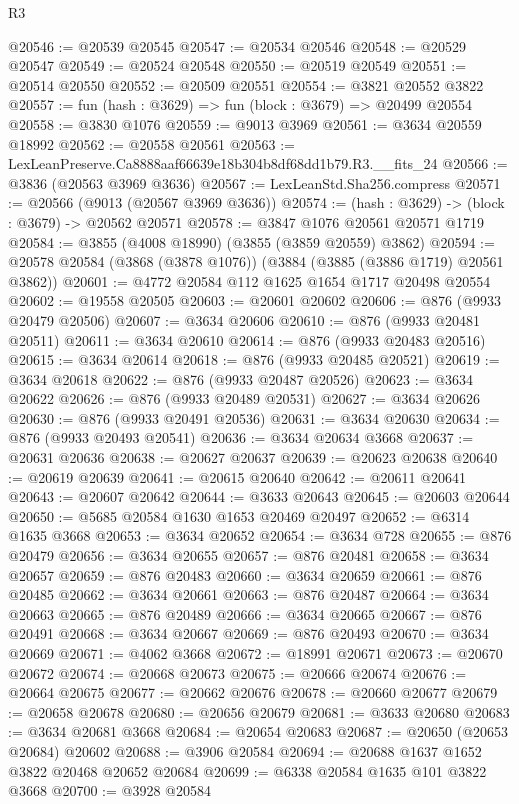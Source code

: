 \begin{lexlean}{R3}
\begin{coremodule}
@20546 := @20539 @20545
@20547 := @20534 @20546
@20548 := @20529 @20547
@20549 := @20524 @20548
@20550 := @20519 @20549
@20551 := @20514 @20550
@20552 := @20509 @20551
@20554 := @3821 @20552 @3822
@20557 := fun (hash : @3629) => fun (block : @3679) => @20499 @20554
@20558 := @3830 @1076
@20559 := @9013 @3969
@20561 := @3634 @20559 @18992
@20562 := @20558 @20561
@20563 := LexLeanPreserve.Ca8888aaf66639e18b304b8df68dd1b79.R3.__fits_24
@20566 := @3836 (@20563 @3969 @3636)
@20567 := LexLeanStd.Sha256.compress
@20571 := @20566 (@9013 (@20567 @3969 @3636))
@20574 := (hash : @3629) -> (block : @3679) -> @20562 @20571
@20578 := @3847 @1076 @20561 @20571 @1719
@20584 := @3855 (@4008 @18990) (@3855 (@3859 @20559) @3862)
@20594 := @20578 @20584 (@3868 (@3878 @1076)) (@3884 (@3885 (@3886 @1719) @20561 @3862))
@20601 := @4772 @20584 @112 @1625 @1654 @1717 @20498 @20554
@20602 := @19558 @20505
@20603 := @20601 @20602
@20606 := @876 (@9933 @20479 @20506)
@20607 := @3634 @20606
@20610 := @876 (@9933 @20481 @20511)
@20611 := @3634 @20610
@20614 := @876 (@9933 @20483 @20516)
@20615 := @3634 @20614
@20618 := @876 (@9933 @20485 @20521)
@20619 := @3634 @20618
@20622 := @876 (@9933 @20487 @20526)
@20623 := @3634 @20622
@20626 := @876 (@9933 @20489 @20531)
@20627 := @3634 @20626
@20630 := @876 (@9933 @20491 @20536)
@20631 := @3634 @20630
@20634 := @876 (@9933 @20493 @20541)
@20636 := @3634 @20634 @3668
@20637 := @20631 @20636
@20638 := @20627 @20637
@20639 := @20623 @20638
@20640 := @20619 @20639
@20641 := @20615 @20640
@20642 := @20611 @20641
@20643 := @20607 @20642
@20644 := @3633 @20643
@20645 := @20603 @20644
@20650 := @5685 @20584 @1630 @1653 @20469 @20497
@20652 := @6314 @1635 @3668
@20653 := @3634 @20652
@20654 := @3634 @728
@20655 := @876 @20479
@20656 := @3634 @20655
@20657 := @876 @20481
@20658 := @3634 @20657
@20659 := @876 @20483
@20660 := @3634 @20659
@20661 := @876 @20485
@20662 := @3634 @20661
@20663 := @876 @20487
@20664 := @3634 @20663
@20665 := @876 @20489
@20666 := @3634 @20665
@20667 := @876 @20491
@20668 := @3634 @20667
@20669 := @876 @20493
@20670 := @3634 @20669
@20671 := @4062 @3668
@20672 := @18991 @20671
@20673 := @20670 @20672
@20674 := @20668 @20673
@20675 := @20666 @20674
@20676 := @20664 @20675
@20677 := @20662 @20676
@20678 := @20660 @20677
@20679 := @20658 @20678
@20680 := @20656 @20679
@20681 := @3633 @20680
@20683 := @3634 @20681 @3668
@20684 := @20654 @20683
@20687 := @20650 (@20653 @20684) @20602
@20688 := @3906 @20584
@20694 := @20688 @1637 @1652 @3822 @20468 @20652 @20684
@20699 := @6338 @20584 @1635 @101 @3822 @3668
@20700 := @3928 @20584

\end{coremodule}
\end{lexlean}
